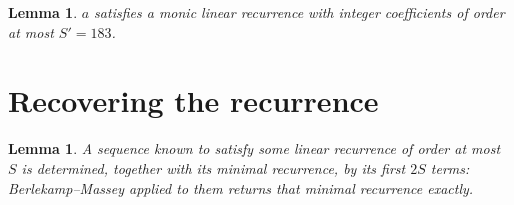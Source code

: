 \documentclass[11pt,a4paper]{article}
\theoremstyle{plain}
\newtheorem{lemma}[theorem]{Lemma}
\theoremstyle{definition}
\begin{document}
\begin{lemma}\label{lem:cf}
$a$ satisfies a monic linear recurrence with integer coefficients of order at most
$S'=183$.
\end{lemma}

\section{Recovering the recurrence}

\begin{lemma}\label{lem:bm}
A sequence known to satisfy some linear recurrence of order at most $S$ is determined, together
with its minimal recurrence, by its first $2S$ terms: Berlekamp--Massey applied to them returns
that minimal recurrence exactly.
\end{lemma}
\end{document}
